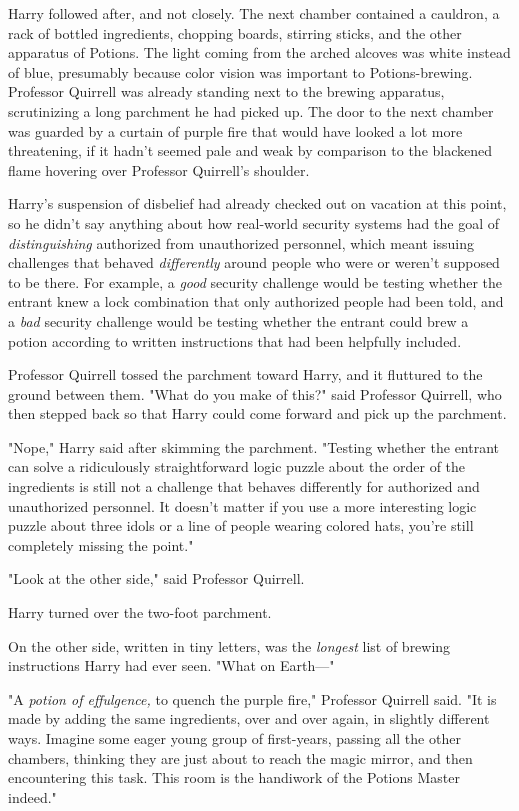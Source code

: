 Harry followed after, and not closely.
\sbreak
The next chamber contained a cauldron, a rack of bottled ingredients, chopping 
boards, stirring sticks, and the other apparatus of Potions. The light coming 
from the arched alcoves was white instead of blue, presumably because color 
vision was important to Potions-brewing. Professor Quirrell was already 
standing next to the brewing apparatus, scrutinizing a long parchment he had 
picked up. The door to the next chamber was guarded by a curtain of purple fire 
that would have looked a lot more threatening, if it hadn't seemed pale and 
weak by comparison to the blackened flame hovering over Professor Quirrell's 
shoulder.

Harry's suspension of disbelief had already checked out on vacation at this 
point, so he didn't say anything about how real-world security systems had the 
goal of \emph{distinguishing} authorized from unauthorized personnel, which 
meant issuing challenges that behaved \emph{differently} around people who were 
or weren't supposed to be there. For example, a \emph{good} security challenge 
would be testing whether the entrant knew a lock combination that only 
authorized people had been told, and a \emph{bad} security challenge would be 
testing whether the entrant could brew a potion according to written 
instructions that had been helpfully included.

Professor Quirrell tossed the parchment toward Harry, and it fluttured to the 
ground between them. "What do you make of this?" said Professor Quirrell, who 
then stepped back so that Harry could come forward and pick up the parchment.

"Nope," Harry said after skimming the parchment. "Testing whether the entrant 
can solve a ridiculously straightforward logic puzzle about the order of the 
ingredients is still not a challenge that behaves differently for authorized 
and unauthorized personnel. It doesn't matter if you use a more interesting 
logic puzzle about three idols or a line of people wearing colored hats, you're 
still completely missing the point."

"Look at the other side," said Professor Quirrell.

Harry turned over the two-foot parchment.

On the other side, written in tiny letters, was the \emph{longest} list of 
brewing instructions Harry had ever seen. "What on Earth---"

"A \emph{potion of effulgence,} to quench the purple fire," Professor Quirrell 
said. "It is made by adding the same ingredients, over and over again, in 
slightly different ways. Imagine some eager young group of first-years, passing 
all the other chambers, thinking they are just about to reach the magic mirror, 
and then encountering this task. This room is the handiwork of the Potions 
Master indeed."

